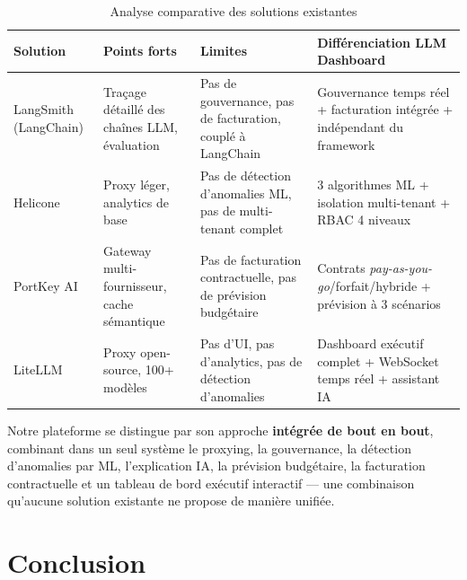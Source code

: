 \begin{table}[H]
\centering
\caption{Analyse comparative des solutions existantes}
\label{tab:comparatif}
\begin{tabularx}{\textwidth}{|p{2.2cm}|X|X|X|}
\hline
\textbf{Solution} & \textbf{Points forts} & \textbf{Limites} & \textbf{Différenciation LLM Dashboard} \\
\hline
LangSmith (LangChain) & Traçage détaillé des chaînes LLM, évaluation & Pas de gouvernance, pas de facturation, couplé à LangChain & Gouvernance temps réel + facturation intégrée + indépendant du framework \\
\hline
Helicone & Proxy léger, analytics de base & Pas de détection d'anomalies ML, pas de multi-tenant complet & 3 algorithmes ML + isolation multi-tenant + RBAC 4 niveaux \\
\hline
PortKey AI & Gateway multi-fournisseur, cache sémantique & Pas de facturation contractuelle, pas de prévision budgétaire & Contrats \textit{pay-as-you-go}/forfait/hybride + prévision à 3 scénarios \\
\hline
LiteLLM & Proxy open-source, 100+ modèles & Pas d'UI, pas d'analytics, pas de détection d'anomalies & Dashboard exécutif complet + WebSocket temps réel + assistant IA \\
\hline
\end{tabularx}
\end{table}

Notre plateforme se distingue par son approche \textbf{intégrée de bout en bout}, combinant dans un seul système le proxying, la gouvernance, la détection d'anomalies par ML, l'explication IA, la prévision budgétaire, la facturation contractuelle et un tableau de bord exécutif interactif --- une combinaison qu'aucune solution existante ne propose de manière unifiée.


\section*{Conclusion}


